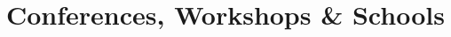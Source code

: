 \newcommand{\event}[2]
  {\normalsize \textbf{\color{hlcolor-0} #1} \hfill {\color{hlcolor-2} #2}}
  
\newcommand{\organizer}[2]
  {\small \color{hlcolor-1} {#1} \hfill {#2}}
  
\newcommand{\contribution}[3][]
  {\normalsize \color{maincolor} \ul{#2:} \emph{``#3''} {#1}}
  
\newcommand{\theme}[1]
  {\normalsize \color{maincolor} \ul{Theme:} \emph{#1}}
  
\newcommand{\button}[2]
  {\large \color{maincolor} \href{#1}{#2}}
  

\section*{Conferences, Workshops \& Schools}
\begin{cvcontent}

\end{cvcontent}
